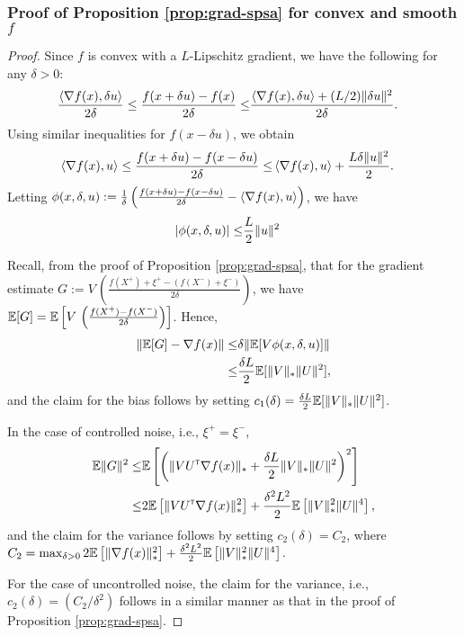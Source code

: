 \subsubsection*{Proof of Proposition \ref{prop:grad-spsa} for convex and smooth $f$}
\begin{proof}
Since $f$ is convex with a  $L$-Lipschitz gradient, we have the following for any $\delta>0$:
\begin{align*}
\frac{\left\langle\nabla f(x), \delta u\right\rangle}{2\delta} \le \frac{f(x + \delta u) -  f(x)}{2\delta} \le& \frac{\left\langle\nabla f(x), \delta u\right\rangle + (L / 2) \|\delta u\|^2}{2\delta}.
\end{align*}
Using similar inequalities for $f(x-\delta u)$, we obtain
\begin{align*}
\left\langle\nabla f(x), u\right\rangle \le \frac{f(x + \delta u) -  f(x-\delta u)}{2\delta} \le& \left\langle\nabla f(x), u\right\rangle + \frac{L \delta \| u\|^2}{2}.
\end{align*}
Letting $\phi(x,\delta,u):=\frac1{\delta}\left(\frac{f(x + \delta u) -  f(x-\delta u)}{2\delta} - \left\langle\nabla f(x),  u\right\rangle\right)$, we have
\begin{align*}
\left|\phi(x,\delta,u) \right| \le&  \dfrac{L}{2} \|u\|^2
\end{align*}

Recall, from the proof of Proposition \ref{prop:grad-spsa}, that for the gradient estimate $G:= V\, \left( \frac{f(X^+) + \xi^+  - (f(X^-) + \xi^-)}{2\delta}\right)$, we have
$\mathbb{E}[G] =  \mathbb{E}\left[V\,  \left(\frac{f(X^+)  -f(X^-)}{2\delta}\right) \right]$. Hence,
\begin{align*}
 \|\mathbb{E}[G] - \nabla f(x)\| \le& \delta \|\mathbb{E}[ V \phi(x,\delta, u)]\|\\
 \le& \frac{\delta L}{2} \mathbb{E}[ \|V\|_* \|U\|^2],
\end{align*}
and the claim for the bias follows by setting $c_1(\delta)= \frac{\delta L}{2} \mathbb{E}[ \|V\|_* \|U\|^2]$.

In the case of controlled noise, i.e., $\xi^+ = \xi^-$, 
\begin{align*}
 \mathbb{E} \|G\|^2 \le & \mathbb{E}\left[ \left( \| V U ^\mathsf{\scriptscriptstyle T} \nabla f(x)\|_* + \frac{\delta L}{2} \|V\|_* \|U\|^2 \right)^2\right]\\
\le & 2 \mathbb{E}\left[  \| V U ^\mathsf{\scriptscriptstyle T} \nabla f(x)\|_*^2\right]  + \frac{\delta^2 L^2}{2}\mathbb{E}\left[ \|V\|_*^2 \|U\|^4 \right],
\end{align*}
and the claim for the variance follows by setting $c_2(\delta) = C_2$, where $C_2 = \max_{\delta >0} 2 \mathbb{E}\left[  \| \nabla f(x)\|_*^2\right]  + \frac{\delta^2 L^2}{2}\mathbb{E}\left[ \|V\|_*^2 \|U\|^4 \right]$.

For the case of uncontrolled noise, the claim for the variance, i.e., $c_2(\delta) = (C_2/\delta^2)$ follows in a similar manner as that in the proof of Proposition \ref{prop:grad-spsa}.
\end{proof}


